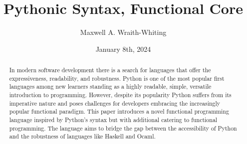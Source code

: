 \documentclass{l4proj}
\begin{document}
\title{Pythonic Syntax, Functional Core}
\author{Maxwell A. Wraith-Whiting}
\date{January 8th, 2024}

\maketitle

\begin{abstract}





    In modern software development there is a search for languages that offer the expressiveness, readability, and robustness.
    Python is one of the most popular first languages among new learners standing as a highly readable, simple, versatile introduction to programming.
    However, despite its popularity Python suffers from its imperative nature and poses challenges for developers embracing the increasingly popular functional paradigm.
    This paper introduces a novel functional programming language inspired by Python’s syntax but with additional catering to functional programming.
    The language aims to bridge the gap between the accessibility of Python and the robustness of languages like Haskell and Ocaml.

\end{abstract}
\end{document}
